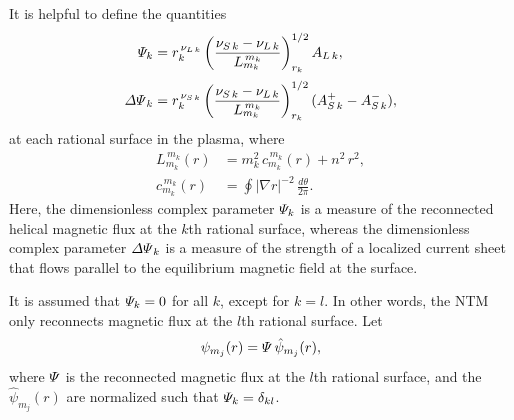 \documentclass{iopjournal}
\begin{document}
It is helpful to define the quantities \cite{tear9}
\begin{align}\label{Psidef}
{\mit\Psi}_k&= r_k^{\,\nu_{L\,k}}\left(\frac{\nu_{S\,k}-\nu_{L\,k}}{L_{m_k}^{\,{m_k}}}\right)^{1/2}_{r_k} A_{L\,k},\\[0.5ex]
{\mit\Delta\Psi}_k &= r_k^{\,\nu_{S\,k}}\left(\frac{\nu_{S\,k}-\nu_{L\,k}}{L_{m_k}^{\,m_k}}\right)^{1/2}_{r_k} (A_{S\,k}^+-A_{S\,k}^-),\label{edpp}
\end{align}
at each rational surface in the plasma, where
\begin{align}
L_{m_k}^{\,m_k}(r) &= m_k^2\,c_{m_k}^{\,m_k}(r) + n^2\,r^2,\\[0.5ex]
c_{m_k}^{\,m_k}(r) &=\oint|\nabla r|^{-2}\,\frac{d\theta}{2\pi}.
\end{align}
 Here, the dimensionless complex parameter ${\mit\Psi}_k$ is a measure of the reconnected helical magnetic flux at the $k$th rational surface, whereas
the dimensionless complex parameter ${\mit\Delta\Psi}_k$ is a measure of the strength of a localized current sheet that flows parallel to the equilibrium magnetic field at the surface.

 It is assumed that ${\mit\Psi}_k = 0$ for all $k$, except for $k=l$. In other words, the NTM only reconnects magnetic flux at the
$l$th rational surface. Let 
\begin{equation}
\psi_{m_j}(r) = {\mit\Psi}\,\hat{\psi}_{m_j}(r),
\end{equation}
where ${\mit\Psi}$ is the reconnected magnetic flux at the $l$th rational surface, and the $\hat{\psi}_{m_j}(r)$ are normalized such that ${\mit\Psi}_k
= \delta_{kl}$. 
\end{document}
